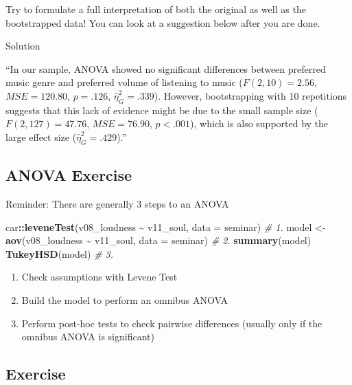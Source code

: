 \documentclass[
]{book}
\newenvironment{Shaded}{\begin{snugshade}}{\end{snugshade}}
\newcommand{\AttributeTok}[1]{\textcolor[rgb]{0.13,0.29,0.53}{#1}}
\newcommand{\CommentTok}[1]{\textcolor[rgb]{0.56,0.35,0.01}{\textit{#1}}}
\newcommand{\FunctionTok}[1]{\textcolor[rgb]{0.13,0.29,0.53}{\textbf{#1}}}
\newcommand{\NormalTok}[1]{#1}
\newcommand{\OtherTok}[1]{\textcolor[rgb]{0.56,0.35,0.01}{#1}}
\newcommand{\SpecialCharTok}[1]{\textcolor[rgb]{0.81,0.36,0.00}{\textbf{#1}}}
\providecommand{\tightlist}{%
  \setlength{\itemsep}{0pt}\setlength{\parskip}{0pt}}
\begin{document}
Try to formulate a full interpretation of both the original as well as the bootstrapped data!
You can look at a suggestion below after you are done.

Solution

``In our sample, ANOVA showed no significant differences between preferred music genre and preferred volume of listening to music (\(F(2, 10) = 2.56\), \(\mathit{MSE} = 120.80\), \(p = .126\), \(\hat{\eta}^2_G = .339\)). However, bootstrapping with 10 repetitions suggests that this lack of evidence might be due to the small sample size (\(F(2, 127) = 47.76\), \(\mathit{MSE} = 76.90\), \(p < .001\)), which is also supported by the large effect size (\(\hat{\eta}^2_G = .429\)).''

\subsection{ANOVA Exercise}\label{anova-exercise}

Reminder: There are generally 3 steps to an ANOVA

\begin{Shaded}
\begin{Highlighting}[]
\NormalTok{car}\SpecialCharTok{::}\FunctionTok{leveneTest}\NormalTok{(v08\_loudness }\SpecialCharTok{\textasciitilde{}}\NormalTok{ v11\_soul, }\AttributeTok{data =}\NormalTok{ seminar) }\CommentTok{\# 1.}
\NormalTok{model }\OtherTok{\textless{}{-}} \FunctionTok{aov}\NormalTok{(v08\_loudness }\SpecialCharTok{\textasciitilde{}}\NormalTok{ v11\_soul, }\AttributeTok{data =}\NormalTok{ seminar) }\CommentTok{\# 2.}
\FunctionTok{summary}\NormalTok{(model)}
\FunctionTok{TukeyHSD}\NormalTok{(model) }\CommentTok{\# 3.}
\end{Highlighting}
\end{Shaded}

\begin{enumerate}
\def\labelenumi{\arabic{enumi}.}
\tightlist
\item
  Check assumptions with Levene Test
\item
  Build the model to perform an omnibus ANOVA
\item
  Perform post-hoc tests to check pairwise differences (usually only if the omnibus ANOVA is significant)
\end{enumerate}

\subsection{Exercise}\label{exercise-5}
\end{document}
